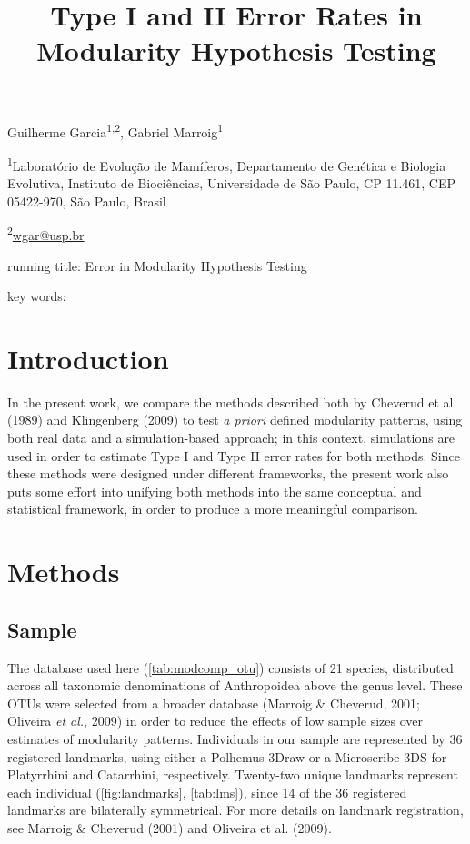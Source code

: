 \documentclass[12pt,]{article}
\title{Type I and II Error Rates in Modularity Hypothesis Testing}
\author{}
\date{}
\begin{document}
\maketitle


\linenumbers
\modulolinenumbers[2]

\onehalfspacing

Guilherme Garcia\textsuperscript{1,2}, Gabriel
Marroig\textsuperscript{1}

\textsuperscript{1}Laboratório de Evolução de Mamíferos, Departamento de
Genética e Biologia Evolutiva, Instituto de Biociências, Universidade de
São Paulo, CP 11.461, CEP 05422-970, São Paulo, Brasil

\textsuperscript{2}\href{mailto:wgar@usp.br}{wgar@usp.br}

running title: Error in Modularity Hypothesis Testing

key words:

\section{Introduction}\label{introduction}

In the present work, we compare the methods described both by Cheverud
et al. (1989) and Klingenberg (2009) to test \emph{a priori} defined
modularity patterns, using both real data and a simulation-based
approach; in this context, simulations are used in order to estimate
Type I and Type II error rates for both methods. Since these methods
were designed under different frameworks, the present work also puts
some effort into unifying both methods into the same conceptual and
statistical framework, in order to produce a more meaningful comparison.

\section{Methods}\label{methods}

\subsection{Sample}\label{sample}

The database used here (\autoref{tab:modcomp_otu}) consists of 21
species, distributed across all taxonomic denominations of Anthropoidea
above the genus level. These OTUs were selected from a broader database
(Marroig \& Cheverud, 2001; Oliveira \emph{et al.}, 2009) in order to
reduce the effects of low sample sizes over estimates of modularity
patterns. Individuals in our sample are represented by 36 registered
landmarks, using either a Polhemus 3Draw or a Microscribe 3DS for
Platyrrhini and Catarrhini, respectively. Twenty-two unique landmarks
represent each individual (\autoref{fig:landmarks}, \autoref{tab:lms}),
since 14 of the 36 registered landmarks are bilaterally symmetrical. For
more details on landmark registration, see Marroig \& Cheverud (2001)
and Oliveira et al. (2009).
\end{document}
